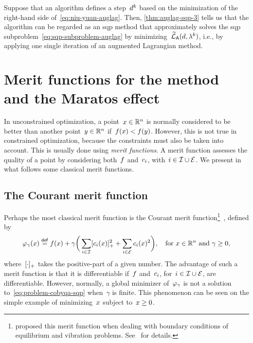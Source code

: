 Suppose that an algorithm defines a step~$\step[k]$ based on the minimization of the right-hand side of~\cref{eq:niu-yuan-auglag}.
Then, \cref{thm:auglag-sqp-3} tells us that the algorithm can be regarded as an \gls{sqp} method that approximately solves the \gls{sqp} subproblem~\cref{eq:sqp-subproblem-auglag} by minimizing~$\auglagalt(\step, \lm[k])$, i.e., by applying one single iteration of an augmented Lagrangian method.

\section{Merit functions for the  method and the Maratos effect}

In unconstrained optimization, a point~$x \in \mathbb{R}^n$ is normally considered to be better than another point~$y \in \mathbb{R}^n$ if~$f(x) < f(y)$.
However, this is not true in constrained optimization, because the constraints must also be taken into account.
This is usually done using \emph{merit functions}.
A merit function assesses the quality of a point by considering both~$f$ and~$c_{i}$, with~$i \in \mathcal{I} \cup \mathcal{E}$.
We present in what follows some classical merit functions.

\subsection{The Courant merit function}

Perhaps the most classical merit function is the Courant merit function\footnote{\citeauthor{Courant_1943} proposed this merit function when dealing with boundary conditions of equilibrium and vibration problems. See~\cite[Pt.~II, \S~3]{Courant_1943} for details.}~\cite{Courant_1943}, defined by
\begin{equation*}
    \merit_{\gamma}(\iter) \eqdef \obj(\iter) + \gamma \bigg( \sum_{i \in \iub} \posp{\con{i}(\iter)}^2 + \sum_{i \in \ieq} \con{i}(\iter)^2 \bigg), \quad \text{for~$x \in \R^n$ and~$\gamma \ge 0$,}
\end{equation*}
where~$[\cdot]_+$ takes the positive-part of a given number.
The advantage of such a merit function is that it is differentiable if~$f$ and~$c_{i}$, for~$i \in \mathcal{I} \cup \mathcal{E}$, are differentiable.
However, normally, a global minimizer of~$\merit_{\gamma}$ is not a solution to~\cref{eq:problem-cobyqa-sqp} when~$\gamma$ is finite.
This phenomenon can be seen on the simple example of minimizing~$\iter$ subject to~$\iter \ge 0$.

